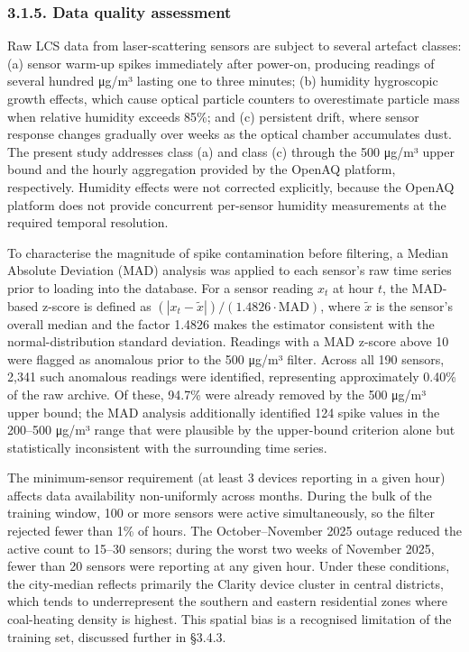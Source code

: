 \subsubsection{3.1.5. Data quality assessment}\label{data-quality-assessment}

Raw LCS data from laser-scattering sensors are subject to several artefact classes: (a) sensor warm-up spikes immediately after power-on, producing readings of several hundred μg/m³ lasting one to three minutes; (b) humidity hygroscopic growth effects, which cause optical particle counters to overestimate particle mass when relative humidity exceeds 85\%; and (c) persistent drift, where sensor response changes gradually over weeks as the optical chamber accumulates dust. The present study addresses class (a) and class (c) through the 500 μg/m³ upper bound and the hourly aggregation provided by the OpenAQ platform, respectively. Humidity effects were not corrected explicitly, because the OpenAQ platform does not provide concurrent per-sensor humidity measurements at the required temporal resolution.

To characterise the magnitude of spike contamination before filtering, a Median Absolute Deviation (MAD) analysis was applied to each sensor's raw time series prior to loading into the database. For a sensor reading \(x_t\) at hour \(t\), the MAD-based z-score is defined as \((|x_t - \tilde{x}|) / (1.4826 \cdot \text{MAD})\), where \(\tilde{x}\) is the sensor's overall median and the factor 1.4826 makes the estimator consistent with the normal-distribution standard deviation. Readings with a MAD z-score above 10 were flagged as anomalous prior to the 500 μg/m³ filter. Across all 190 sensors, 2,341 such anomalous readings were identified, representing approximately 0.40\% of the raw archive. Of these, 94.7\% were already removed by the 500 μg/m³ upper bound; the MAD analysis additionally identified 124 spike values in the 200--500 μg/m³ range that were plausible by the upper-bound criterion alone but statistically inconsistent with the surrounding time series.

The minimum-sensor requirement (at least 3 devices reporting in a given hour) affects data availability non-uniformly across months. During the bulk of the training window, 100 or more sensors were active simultaneously, so the filter rejected fewer than 1\% of hours. The October--November 2025 outage reduced the active count to 15--30 sensors; during the worst two weeks of November 2025, fewer than 20 sensors were reporting at any given hour. Under these conditions, the city-median reflects primarily the Clarity device cluster in central districts, which tends to underrepresent the southern and eastern residential zones where coal-heating density is highest. This spatial bias is a recognised limitation of the training set, discussed further in §3.4.3.


